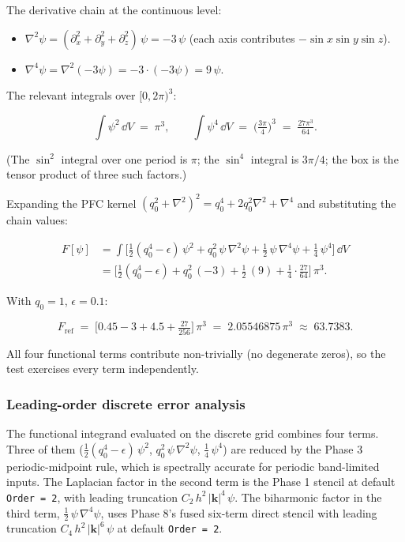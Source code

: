 The derivative chain at the continuous level:

\begin{itemize}
\tightlist
\item \(\nabla^2\psi = (\partial_x^2 + \partial_y^2 + \partial_z^2)\,\psi = -3\,\psi\) (each axis contributes \(-\sin x\sin y\sin z\)).
\item \(\nabla^4\psi = \nabla^2(-3\psi) = -3 \cdot (-3\psi) = 9\,\psi\).
\end{itemize}

The relevant integrals over \([0, 2\pi)^3\):

\[
\int \psi^2\,\dd V \;=\; \pi^3, \qquad
\int \psi^4\,\dd V \;=\; \big(\tfrac{3\pi}{4}\big)^3 \;=\; \tfrac{27\pi^3}{64}.
\]

(The \(\sin^2\) integral over one period is \(\pi\); the \(\sin^4\)
integral is \(3\pi/4\); the box is the tensor product of three such
factors.)

Expanding the PFC kernel
\((q_0^2 + \nabla^2)^2 = q_0^4 + 2q_0^2\nabla^2 + \nabla^4\) and
substituting the chain values:

\begin{align*}
F[\psi] &= \int\!\Big[\tfrac{1}{2}(q_0^4 - \epsilon)\,\psi^2 + q_0^2\,\psi\,\nabla^2\psi + \tfrac{1}{2}\,\psi\,\nabla^4\psi + \tfrac{1}{4}\,\psi^4\Big]\,\dd V \\
&= \Big[\tfrac{1}{2}(q_0^4 - \epsilon) + q_0^2\,(-3) + \tfrac{1}{2}\,(9) + \tfrac{1}{4}\cdot\tfrac{27}{64}\Big]\,\pi^3.
\end{align*}

With \(q_0 = 1\), \(\epsilon = 0.1\):

\[
F_{\text{ref}} \;=\; \big[0.45 - 3 + 4.5 + \tfrac{27}{256}\big]\,\pi^3 \;=\; 2.05546875\,\pi^3 \;\approx\; 63.7383.
\]

All four functional terms contribute non-trivially (no degenerate
zeros), so the test exercises every term independently.

\subsubsection{Leading-order discrete error
analysis}\label{phase11-error}

The functional integrand evaluated on the discrete grid combines four
terms. Three of them
(\(\tfrac{1}{2}(q_0^4 - \epsilon)\,\psi^2\),
\(q_0^2\,\psi\,\nabla^2\psi\),
\(\tfrac{1}{4}\,\psi^4\)) are reduced by the Phase 3 periodic-midpoint
rule, which is spectrally accurate for periodic band-limited inputs.
The Laplacian factor in the second term is the Phase 1 stencil at
default \passthrough{\lstinline!Order = 2!}, with leading truncation
\(C_2\,h^2\,|\mathbf{k}|^4\,\psi\). The biharmonic factor in the third
term, \(\tfrac{1}{2}\,\psi\,\nabla^4\psi\), uses Phase 8's fused
six-term direct stencil with leading truncation
\(C_4\,h^2\,|\mathbf{k}|^6\,\psi\) at default
\passthrough{\lstinline!Order = 2!}.


